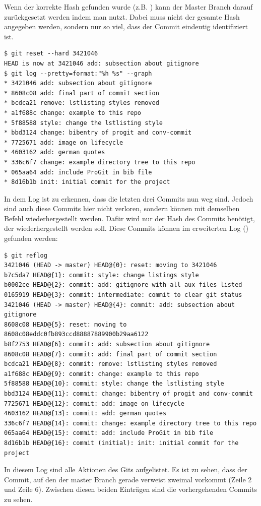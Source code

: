 Wenn der korrekte Hash gefunden wurde (z.B. )  kann der Master Branch darauf zurückgesetzt werden indem man  nutzt. Dabei muss nicht der gesamte Hash angegeben werden, sondern nur so viel, dass der Commit eindeutig identifiziert ist.
\begin{lstlisting}
$ git reset --hard 3421046
HEAD is now at 3421046 add: subsection about gitignore
$ git log --pretty=format:"%h %s" --graph
* 3421046 add: subsection about gitignore
* 8608c08 add: final part of commit section
* bcdca21 remove: lstlisting styles removed
* a1f688c change: example to this repo
* 5f88588 style: change the lstlisting style
* bbd3124 change: bibentry of progit and conv-commit
* 7725671 add: image on lifecycle
* 4603162 add: german quotes
* 336c6f7 change: example directory tree to this repo
* 065aa64 add: include ProGit in bib file
* 8d16b1b init: initial commit for the project
\end{lstlisting}
In dem Log ist zu erkennen, dass die letzten drei Commits nun weg sind. Jedoch sind auch diese Commits hier nicht verloren, sondern können mit demselben Befehl wiederhergestellt werden. Dafür wird nur der Hash des Commits benötigt, der wiederhergestellt werden soll. Diese Commits können im erweiterten Log () gefunden werden:
\begin{lstlisting}
$ git reflog
3421046 (HEAD -> master) HEAD@{0}: reset: moving to 3421046
b7c5da7 HEAD@{1}: commit: style: change listings style
b0002ce HEAD@{2}: commit: add: gitignore with all aux files listed
0165919 HEAD@{3}: commit: intermediate: commit to clear git status
3421046 (HEAD -> master) HEAD@{4}: commit: add: subsection about gitignore
8608c08 HEAD@{5}: reset: moving to 8608c08eddc0fb893ccd88887889900b29aa6122
b8f2753 HEAD@{6}: commit: add: subsection about gitignore
8608c08 HEAD@{7}: commit: add: final part of commit section
bcdca21 HEAD@{8}: commit: remove: lstlisting styles removed
a1f688c HEAD@{9}: commit: change: example to this repo
5f88588 HEAD@{10}: commit: style: change the lstlisting style
bbd3124 HEAD@{11}: commit: change: bibentry of progit and conv-commit
7725671 HEAD@{12}: commit: add: image on lifecycle
4603162 HEAD@{13}: commit: add: german quotes
336c6f7 HEAD@{14}: commit: change: example directory tree to this repo
065aa64 HEAD@{15}: commit: add: include ProGit in bib file
8d16b1b HEAD@{16}: commit (initial): init: initial commit for the project
\end{lstlisting}
In diesem Log sind alle Aktionen des Gits aufgelistet. Es ist zu sehen, dass der Commit, auf den der master Branch gerade verweist zweimal vorkommt (Zeile 2 und Zeile 6). Zwischen diesen beiden Einträgen sind die vorhergehenden Commits zu sehen.






